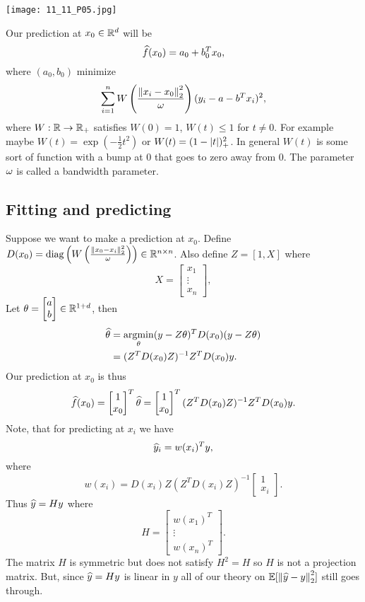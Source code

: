 \begin{center}
    \texttt{[image: 11\_11\_P05.jpg]}    
\end{center}

Our prediction at $x_0 \in {\mathbb R}^d$ will be 
\[\widehat{f}(x_0) = a_0+b_0^Tx_0,\]
where $(a_0,b_0)$ minimize
\[\sum_{i=1}^n W\left(\frac{\left\|x_i-x_0\right\|^2_2}{{\omega}}\right)(y_i-a-b^Tx_i)^2, \]
where $W : {\mathbb R} \to {\mathbb R}_+$ satisfies $W(0)=1$, $W(t) \le 1$ for $t \neq 0$. For example maybe $W(t) =\exp(-\frac{1}{2}t^2)$ or $W(t) = (1-{\left\lvert t\right\rvert})^2_+$. In general $W(t)$ is some sort of function with a bump at 0 that goes to zero away from 0. The parameter ${\omega}$ is called a bandwidth parameter.
\subsection{Fitting and predicting}
Suppose we want to make a prediction at $x_0$. Define $D(x_0)=\operatorname*{diag}\left(W\left(\frac{\left\|x_0-x_i\right\|_2^2}{{\omega}}\right)\right) \in {\mathbb R}^{n\times n}$. Also define $Z=[1,X]$ where 
\[X=\begin{bmatrix}
    x_1\\\vdots \\ x_n
\end{bmatrix}, \]
Let ${\theta} = \begin{bmatrix}a\\ b\end{bmatrix} \in {\mathbb R}^{1+d}$, then
\begin{align*}
    \widehat{{\theta}} &= \operatorname*{argmin}_{\theta} (y-Z{\theta})^T D(x_0)(y-Z{\theta})\\
    &= (Z^TD(x_0)Z)^{-1}Z^TD(x_0)y.
\end{align*}
Our prediction at $x_0$ is thus
\[\widehat{f}(x_0) = \begin{bmatrix}1\\x_0\end{bmatrix}^T \widehat{{\theta}} =\begin{bmatrix}1\\x_0\end{bmatrix}^T (Z^TD(x_0)Z)^{-1}Z^TD(x_0)y. \]
Note, that for predicting at $x_i$ we have 
\[\widehat{y}_i = w(x_i)^T y, \]
where 
\[w(x_i) = D(x_i)Z(Z^TD(x_i)Z)^{-1}\begin{bmatrix}
    1\\x_i
\end{bmatrix}.\]
Thus $\widehat{y} = Hy$ where 
\[H = \begin{bmatrix}
    w(x_1)^T\\
    \vdots \\
    w(x_n)^T
\end{bmatrix}.\]
The matrix $H$ is symmetric but does not satisfy $H^2=H$ so $H$ is not a projection matrix. But, since $\widehat{y}=Hy$ is linear in $y$ all of our theory on ${\mathbb{E}}[\left\|\widehat{y}-y\right\|_2^2]$ still goes through.
